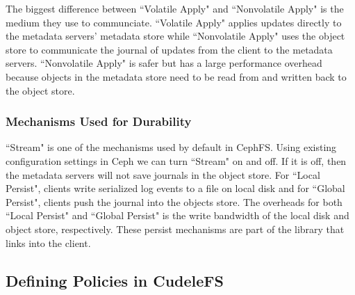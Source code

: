 The biggest difference between ``Volatile Apply" and ``Nonvolatile Apply" is
the medium they use to communciate. ``Volatile Apply" applies updates directly
to the metadata servers' metadata store while ``Nonvolatile Apply" uses the
object store to communicate the journal of updates from the client to the
metadata servers.  ``Nonvolatile Apply" is safer but has a large performance
overhead because objects in the metadata store need to be read from and written
back to the object store.


\subsubsection{Mechanisms Used for Durability} ``Stream" is one of the
mechanisms used by default in CephFS.  Using existing configuration settings in
Ceph we can turn ``Stream" on and off.  If it is off, then the metadata servers
will not save journals in the object store. For ``Local Persist", clients write
serialized log events to a file on local disk and for ``Global Persist",
clients push the journal into the objects store. The overheads for both ``Local
Persist" and ``Global Persist" is the write bandwidth of the local disk and
object store, respectively.  These persist mechanisms are part of the library that
links into the client.

\subsection{Defining Policies in CudeleFS}
\label{sec:setting-policies-with-cudele}

